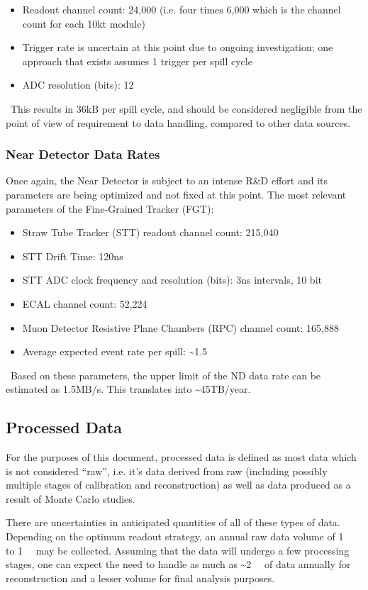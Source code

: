 \begin{itemize}
\item Readout channel count: 24,000 (i.e. four times 6,000 which is the channel count for each 10kt module)
\item Trigger rate is uncertain at this point due to ongoing investigation; one approach that exists assumes 1 trigger per spill cycle
\item ADC resolution (bits): 12
\end{itemize}
\
This results in 36kB per spill cycle, and should be considered negligible from the point of view of requirement to data handling, compared to other data sources.

\subsubsection{Near Detector Data Rates}
Once again, the Near Detector is subject to an intense R\&D effort and its
parameters are being optimized and not fixed at this point. The most relevant parameters
of the Fine-Grained Tracker (FGT):
\begin{itemize}
\item   Straw Tube Tracker (STT) readout channel count: 215,040
\item STT Drift Time: 120ns
\item STT ADC clock frequency and resolution (bits): 3ns intervals, 10 bit
\item ECAL channel count: 52,224
\item Muon Detector Resistive Plane Chambers (RPC) channel count: 165,888
\item Average expected event rate per spill: \textasciitilde 1.5
\end{itemize}
\
Based on these parameters, the upper limit of the ND data rate can be estimated as 1.5MB/s. This translates into \textasciitilde 45TB/year. 

\subsection{Processed Data}
\label{sec:detectors-sc-infrastructure-processed-data}
For the purposes of this document, processed data is defined as most data which is not considered ``raw'', i.e. it's data derived from raw (including possibly multiple stages
of calibration and reconstruction) as well as data produced as a result of Monte Carlo studies.

There are uncertainties in anticipated quantities of all of these types of data.
Depending on the optimum readout strategy, an annual raw data volume of
\SI{1}{\tera\byte} to \SI{1}{\peta\byte} may be collected.
Assuming that
the data will undergo a few processing stages, one can expect the need
to handle as much as \textasciitilde \SI{2}{\peta\byte} of data annually for reconstruction and a lesser
volume for final analysis purposes.

